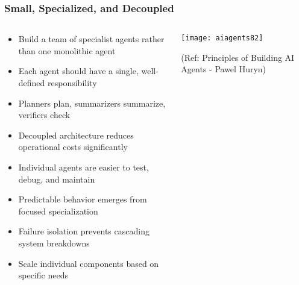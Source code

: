 \begin{frame}[fragile]\frametitle{Small, Specialized, and Decoupled}
\begin{columns}
    \begin{column}[T]{0.6\linewidth}
      \begin{itemize}
		\item Build a team of specialist agents rather than one monolithic agent
		\item Each agent should have a single, well-defined responsibility
		\item Planners plan, summarizers summarize, verifiers check
		\item Decoupled architecture reduces operational costs significantly
		\item Individual agents are easier to test, debug, and maintain
		\item Predictable behavior emerges from focused specialization
		\item Failure isolation prevents cascading system breakdowns
		\item Scale individual components based on specific needs
	  \end{itemize}
    \end{column}
    \begin{column}[T]{0.4\linewidth}
		\begin{center}
		\texttt{[image: aiagents82]}
		
		{\tiny (Ref: Principles of Building AI Agents - Pawel Huryn)}
		\end{center}		
    \end{column}
  \end{columns}
\end{frame}

